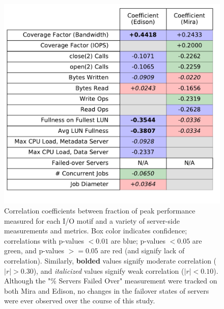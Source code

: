 \begin{figure}[t]
    \centering
    \includegraphics[width=\columnwidth]{figs/correlation_table.pdf}
    \caption{Correlation coefficients between fraction of peak performance measured for each I/O motif and a variety of server-side measurements and metrics.
    Box color indicates confidence; correlations with p-values $< 0.01$ are blue; p-values $< 0.05$ are green, and p-values $>= 0.05$ are red (and signify lack of correlation).
    Similarly, \textbf{bolded} values signify moderate correlation ($|r| > 0.30$), and \textit{italicized} values signify weak correlation ($|r| < 0.10$).
    Although the "\% Servers Failed Over" measurement were tracked on both Mira and Edison, no changes in the failover states of servers were ever observed over the course of this study.
    }
    \label{fig:correlation-table}
\end{figure}

